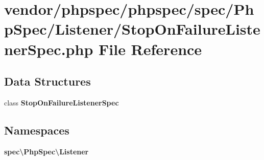 \section{vendor/phpspec/phpspec/spec/\+Php\+Spec/\+Listener/\+Stop\+On\+Failure\+Listener\+Spec.php File Reference}
\label{_stop_on_failure_listener_spec_8php}
\subsection*{Data Structures}
\begin{DoxyCompactItemize}
\item 
class {\bf Stop\+On\+Failure\+Listener\+Spec}
\end{DoxyCompactItemize}
\subsection*{Namespaces}
\begin{DoxyCompactItemize}
\item 
 {\bf spec\textbackslash{}\+Php\+Spec\textbackslash{}\+Listener}
\end{DoxyCompactItemize}
